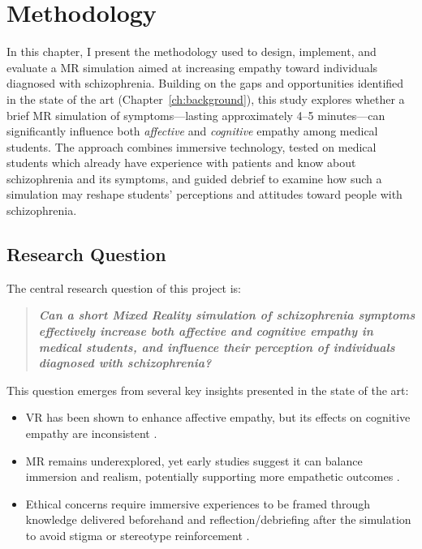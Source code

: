 \chapter{Methodology}
\label{ch:method}



In this chapter, I present the methodology used to design, implement, and evaluate a MR simulation aimed at increasing empathy toward individuals diagnosed with schizophrenia. Building on the gaps and opportunities identified in the state of the art (Chapter~\ref{ch:background}), this study explores whether a brief MR simulation of symptoms—lasting approximately 4--5 minutes—can significantly influence both \textit{affective} and \textit{cognitive} empathy among medical students. The approach combines immersive technology, tested on medical students which already have experience with patients and know about schizophrenia and its symptoms, and guided debrief to examine how such a simulation may reshape students' perceptions and attitudes toward people with schizophrenia.

\section{Research Question}

The central research question of this project is:

\begin{quote}
\textit{\textbf{Can a short Mixed Reality simulation of schizophrenia symptoms effectively increase both affective and cognitive empathy in medical students, and influence their perception of individuals diagnosed with schizophrenia?}}
\end{quote}

This question emerges from several key insights presented in the state of the art:

\begin{itemize}
    \item VR has been shown to enhance affective empathy, but its effects on cognitive empathy are inconsistent \cite{Martingano2021, Ventura2020}.
    \item MR remains underexplored, yet early studies suggest it can balance immersion and realism, potentially supporting more empathetic outcomes \cite{Silva2017, Krogmeier2024}.
    \item Ethical concerns require immersive experiences to be framed through knowledge delivered beforehand and reflection/debriefing after the simulation to avoid stigma or stereotype reinforcement \cite{Rueda2020, Ando2011}.
\end{itemize}


